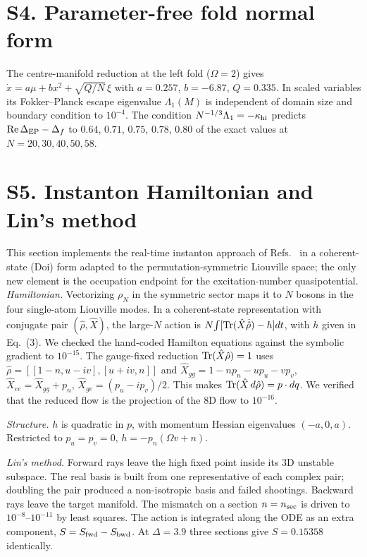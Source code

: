 \documentclass[aps,prl,onecolumn,superscriptaddress,amsmath,amssymb]{revtex4-2}
\begin{document}
\section{S4. Parameter-free fold normal form}
The centre-manifold reduction at the left fold ($\Omega=2$) gives $\dot x=a\mu+bx^2+\sqrt{Q/N}\,\xi$ with $a=0.257$, $b=-6.87$, $Q=0.335$. In scaled variables its Fokker--Planck escape eigenvalue $\Lambda_1(M)$ is independent of domain size and boundary condition to $10^{-4}$. The condition $N^{-1/3}\Lambda_1=-\kappa_{\rm hi}$ predicts ${\rm Re}\,\Delta_{\rm EP}-\Delta_f$ to $0.64$, $0.71$, $0.75$, $0.78$, $0.80$ of the exact values at $N=20,30,40,50,58$.

\section{S5. Instanton Hamiltonian and Lin's method}
This section implements the real-time instanton approach of Refs.~\cite{PCE2026L,CEP2026} in a coherent-state (Doi) form adapted to the permutation-symmetric Liouville space; the only new element is the occupation endpoint for the excitation-number quasipotential.
\emph{Hamiltonian.} Vectorizing $\rho_N$ in the symmetric sector maps it to $N$ bosons in the four single-atom Liouville modes. In a coherent-state representation with conjugate pair $(\hat\rho,\hat X)$, the large-$N$ action is $N\!\int[{\rm Tr}(\hat X\dot{\hat\rho})-h]dt$, with $h$ given in Eq.~(3). We checked the hand-coded Hamilton equations against the symbolic gradient to $10^{-15}$. The gauge-fixed reduction ${\rm Tr}(\hat X\hat\rho)=1$ uses $\hat\rho=[[1-n,u-iv],[u+iv,n]]$ and $\hat X_{gg}=1-np_n-up_u-vp_v$, $\hat X_{ee}=\hat X_{gg}+p_n$, $\hat X_{ge}=(p_u-ip_v)/2$. This makes ${\rm Tr}(\hat X\,d\hat\rho)=p\cdot dq$. We verified that the reduced flow is the projection of the 8D flow to $10^{-16}$.

\emph{Structure.} $h$ is quadratic in $p$, with momentum Hessian eigenvalues $(-a,0,a)$. Restricted to $p_u=p_v=0$, $h=-p_n(\Omega v+n)$.

\emph{Lin's method.} Forward rays leave the high fixed point inside its 3D unstable subspace. The real basis is built from one representative of each complex pair; doubling the pair produced a non-isotropic basis and failed shootings. Backward rays leave the target manifold. The mismatch on a section $n=n_{\rm sec}$ is driven to $10^{-8}$--$10^{-11}$ by least squares. The action is integrated along the ODE as an extra component, $S=S_{\rm fwd}-S_{\rm bwd}$. At $\Delta=3.9$ three sections give $S=0.15358$ identically.
\end{document}
